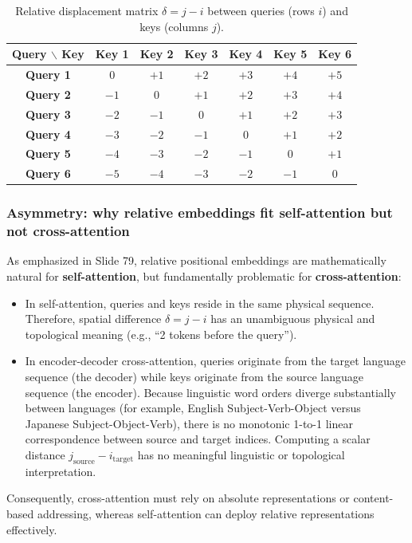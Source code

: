 \documentclass[../../main.tex]{subfiles}
\begin{document}
\begin{table}[htbp]
\centering
\small
\caption{Relative displacement matrix $\delta = j - i$ between queries (rows $i$) and keys (columns $j$).}
\label{tab:relative_offsets_grid}
\begin{tabular}{c c c c c c c}
\toprule
\textbf{Query $\backslash$ Key} & \textbf{Key 1} & \textbf{Key 2} & \textbf{Key 3} & \textbf{Key 4} & \textbf{Key 5} & \textbf{Key 6} \\
\midrule
\textbf{Query 1} & $0$ & $+1$ & $+2$ & $+3$ & $+4$ & $+5$ \\
\textbf{Query 2} & $-1$ & $0$ & $+1$ & $+2$ & $+3$ & $+4$ \\
\textbf{Query 3} & $-2$ & $-1$ & $0$ & $+1$ & $+2$ & $+3$ \\
\textbf{Query 4} & $-3$ & $-2$ & $-1$ & $0$ & $+1$ & $+2$ \\
\textbf{Query 5} & $-4$ & $-3$ & $-2$ & $-1$ & $0$ & $+1$ \\
\textbf{Query 6} & $-5$ & $-4$ & $-3$ & $-2$ & $-1$ & $0$ \\
\bottomrule
\end{tabular}
\end{table}

\subsubsection{Asymmetry: why relative embeddings fit self-attention but not cross-attention}
As emphasized in Slide 79, relative positional embeddings are mathematically natural for \textbf{self-attention}, but fundamentally problematic for \textbf{cross-attention}:
\begin{itemize}
    \item In self-attention, queries and keys reside in the same physical sequence. Therefore, spatial difference $\delta = j - i$ has an unambiguous physical and topological meaning (e.g., ``2 tokens before the query'').
    \item In encoder-decoder cross-attention, queries originate from the target language sequence (the decoder) while keys originate from the source language sequence (the encoder). Because linguistic word orders diverge substantially between languages (for example, English Subject-Verb-Object versus Japanese Subject-Object-Verb), there is no monotonic 1-to-1 linear correspondence between source and target indices. Computing a scalar distance $j_{\text{source}} - i_{\text{target}}$ has no meaningful linguistic or topological interpretation.
\end{itemize}
Consequently, cross-attention must rely on absolute representations or content-based addressing, whereas self-attention can deploy relative representations effectively.
\end{document}
